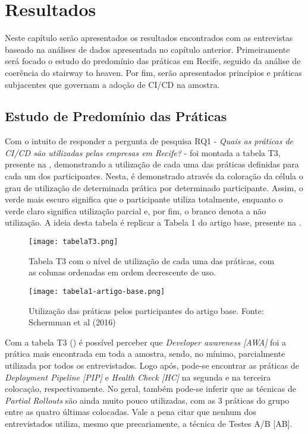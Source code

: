 
\chapter{Resultados}

Neste capítulo serão apresentados os resultados encontrados com as entrevistas baseado na análises de dados apresentada no capítulo anterior. Primeiramente será focado o estudo do predomínio das práticas em Recife, seguido da análise de coerência do stairway to heaven. Por fim, serão apresentados princípios e práticas subjacentes que governam a adoção de CI/CD na amostra.

\section{Estudo de Predomínio das Práticas}

Com o intuito de responder a pergunta de pesquisa RQ1 - \emph{Quais as práticas de CI/CD são utilizadas pelas empresas em Recife?} - foi montada a tabela T3, presente na , demonstrando a utilização de cada uma das práticas definidas para cada um dos participantes. Nesta, é demonstrado através da coloração da célula o grau de utilização de determinada prática por determinado participante. Assim, o verde mais escuro significa que o participante utiliza totalmente, enquanto o verde claro significa utilização parcial e, por fim, o branco denota a não utilização. A ideia desta tabela é replicar a Tabela 1 do artigo base, presente na .

\begin{figure}[ht]
\begin{center}
\texttt{[image: tabelaT3.png]}
\end{center}
\caption[Tabela T3]{
    Tabela T3 com o nível de utilização de cada uma das práticas, com as colunas ordenadas em ordem decrescente de uso.
}\label{tabela_t3}
\end{figure}

\begin{figure}[ht]
\begin{center}
\texttt{[image: tabela1-artigo-base.png]}
\end{center}
\caption[Tabela 1 do artigo base]{
    Utilização das práticas pelos participantes do artigo base.
    Fonte: Schermman et al (2016)
}\label{tabela_1_artigo_base}
\end{figure}

Com a tabela T3 () é possível perceber que \emph{Developer awareness [AWA]} foi a prática mais encontrada em toda a amostra, sendo, no mínimo, parcialmente utilizada por todos os entrevistados. Logo após, pode-se encontrar as práticas de \emph{Deployment Pipeline [PIP]} e \emph{Health Check [HC]} na segunda e na terceira colocação, respectivamente. No geral, também pode-se inferir que as técnicas de \emph{Partial Rollouts} são ainda muito pouco utilizadas, com as 3 práticas do grupo entre as quatro últimas colocadas. Vale a pena citar que nenhum dos entrevistados utiliza, mesmo que precariamente, a técnica de Testes A/B [AB].

